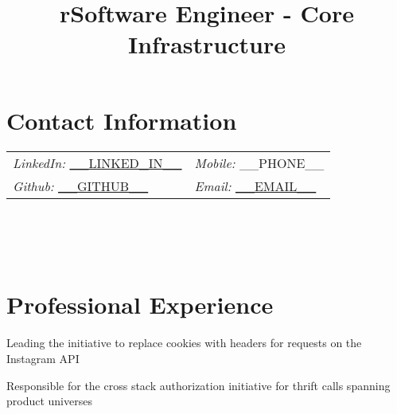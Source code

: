 \documentclass[margin,line]{resume}
\newenvironment{bullet-list}{
  \begin{list}{$\bullet$}{%
      \setlength{\itemsep}{0in}
      \setlength{\parsep}{0in} \setlength{\parskip}{0in}
      \setlength{\topsep}{0in} \setlength{\partopsep}{0in}
      \setlength{\leftmargin}{0.2in}}}{\end{list}}
\begin{document}
\begin{resume}

\section{\sc Contact Information}
\vspace{.05in}
\begin{tabular}{@{}p{3.87in}p{2in}}
    {\it LinkedIn:} \href{https://www.__LINKEDIN__}{__LINKED_IN__}     & \hfill{\it Mobile:} __PHONE__\\
{\it Github:} \href{https://__GITHUB__}{__GITHUB__}     & \hfill{\it Email:} \href{mailto:__EMAIL__}{__EMAIL__}\\
\end{tabular}

\begin{format}
  \title{r}\\
  \\
  \body\\
\end{format}

\section{\sc Professional Experience}

\title{Software Engineer - Core Infrastructure}
\begin{position}
\vspace{-.3cm}
\begin{bullet-list}
\item Leading the initiative to replace cookies with headers for
requests on the Instagram API
\item Responsible for the cross stack authorization initiative for thrift
calls spanning product universes
\end{bullet-list}
\end{position}


\end{resume}
\end{document}
